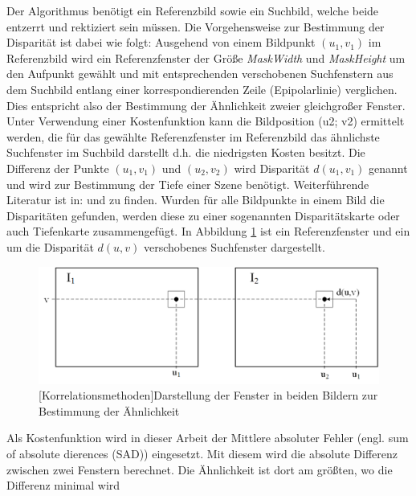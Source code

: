 \documentclass[times, 10pt,twocolumn]{article}
\begin{document}

Der Algorithmus benötigt ein Referenzbild sowie ein Suchbild, welche beide entzerrt und rektiziert sein müssen. Die Vorgehensweise zur Bestimmung der Disparität ist dabei wie folgt: Ausgehend von einem Bildpunkt $(u_1,v_1)$ im Referenzbild wird ein Referenzfenster der Größe \textit{MaskWidth} und \textit{MaskHeight} um den Aufpunkt gewählt und mit entsprechenden verschobenen Suchfenstern aus dem Suchbild entlang einer korrespondierenden Zeile (Epipolarlinie) verglichen. Dies entspricht also der Bestimmung der Ähnlichkeit zweier gleichgroßer Fenster. Unter Verwendung einer Kostenfunktion kann die Bildposition (u2; v2) ermittelt werden, die für das gewählte Referenzfenster im Referenzbild das ähnlichste Suchfenster im Suchbild darstellt d.h. die niedrigsten Kosten besitzt. Die Differenz der Punkte $(u_1,v_1)$ und $(u_2,v_2)$ wird Disparität $d(u_1,v_1)$ genannt und wird zur Bestimmung der Tiefe einer Szene benötigt. Weiterführende Literatur ist in: \cite{Hartley.2003} und \cite{Schreer.2005} zu finden. Wurden für alle Bildpunkte in einem Bild die Disparitäten gefunden, werden diese zu einer sogenannten Disparitätskarte oder auch Tiefenkarte zusammengefügt. In Abbildung \ref{fig:korrelationsmethoden} ist ein Referenzfenster und ein um die Disparität $d(u,v)$ verschobenes Suchfenster dargestellt.

\begin{figure}[!ht]
	\centering
	\includegraphics[width=0.9\linewidth]{image/korrelationsverfahren.png}
	[Korrelationsmethoden]{Darstellung der Fenster in beiden Bildern zur Bestimmung der Ähnlichkeit}
	\label{fig:korrelationsmethoden}
\end{figure}


Als Kostenfunktion wird in dieser Arbeit der Mittlere absoluter Fehler (engl. sum of absolute dierences (SAD)) eingesetzt. Mit diesem wird die absolute Differenz zwischen zwei Fenstern berechnet. Die Ähnlichkeit ist dort am größten, wo die Differenz minimal wird
\end{document}

